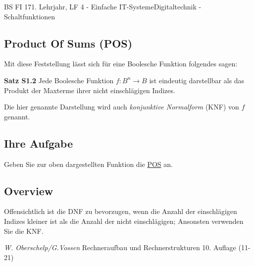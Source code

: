 \documentclass[11pt,twocolumn,oneside,openany,headings=optiontotoc,11pt,numbers=noenddot]{article}
\begin{document}
\begin{worksheet}{BS FI 17}{1. Lehrjahr, LF 4 - Einfache IT-Systeme}{Digitaltechnik - Schaltfunktionen}
		\subsection{Product Of Sums (POS)}
		Mit diese Feststellung lässt sich für eine Boolesche Funktion folgendes sagen:
		\begin{framed}
			\textbf{Satz S1.2} Jede Boolesche Funktion \(f: B^n \rightarrow B\) ist eindeutig darstellbar als das Produkt der Maxterme ihrer nicht einschlägigen Indizes.
		\end{framed}
		Die hier genannte Darstellung wird auch \textit{konjunktive Normalform} (KNF) von \(f\) genannt.
		\subsection*{Ihre Aufgabe} Geben Sie zur oben dargestellten Funktion die \underline{POS} an.
		\subsection{Overview} Offensichtlich ist die DNF zu bevorzugen, wenn die Anzahl der einschlägigen Indizes kleiner ist als die Anzahl der nicht einschlägigen; Ansonsten verwenden Sie die KNF.\\
		\par\bigskip\noindent
		\tiny{\color{codegray}\textit{W. Oberschelp/G.Vossen} Rechneraufbau und Rechnerstrukturen 10. Auflage (11-21)}
	\end{worksheet}
\end{document}
